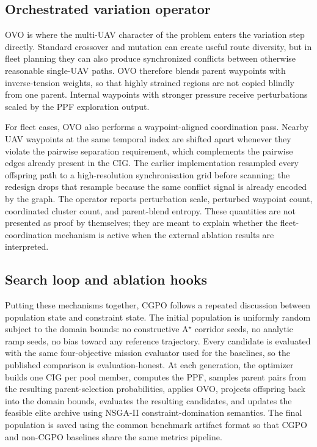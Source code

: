 \subsection{Orchestrated variation operator}
\label{subsec:ovo}

OVO is where the multi-UAV character of the problem enters the variation step directly. Standard crossover and mutation can create useful route diversity, but in fleet planning they can also produce synchronized conflicts between otherwise reasonable single-UAV paths. OVO therefore blends parent waypoints with inverse-tension weights, so that highly strained regions are not copied blindly from one parent. Internal waypoints with stronger pressure receive perturbations scaled by the PPF exploration output.

For fleet cases, OVO also performs a waypoint-aligned coordination pass. Nearby UAV waypoints at the same temporal index are shifted apart whenever they violate the pairwise separation requirement, which complements the pairwise edges already present in the CIG. The earlier implementation resampled every offspring path to a high-resolution synchronisation grid before scanning; the redesign drops that resample because the same conflict signal is already encoded by the graph. The operator reports perturbation scale, perturbed waypoint count, coordinated cluster count, and parent-blend entropy. These quantities are not presented as proof by themselves; they are meant to explain whether the fleet-coordination mechanism is active when the external ablation results are interpreted.

\subsection{Search loop and ablation hooks}
\label{subsec:cgpo-loop}

Putting these mechanisms together, CGPO follows a repeated discussion between population state and constraint state. The initial population is uniformly random subject to the domain bounds: no constructive A$^\star$ corridor seeds, no analytic ramp seeds, no bias toward any reference trajectory. Every candidate is evaluated with the same four-objective mission evaluator used for the baselines, so the published comparison is evaluation-honest. At each generation, the optimizer builds one CIG per pool member, computes the PPF, samples parent pairs from the resulting parent-selection probabilities, applies OVO, projects offspring back into the domain bounds, evaluates the resulting candidates, and updates the feasible elite archive using NSGA-II constraint-domination semantics. The final population is saved using the common benchmark artifact format so that CGPO and non-CGPO baselines share the same metrics pipeline.

